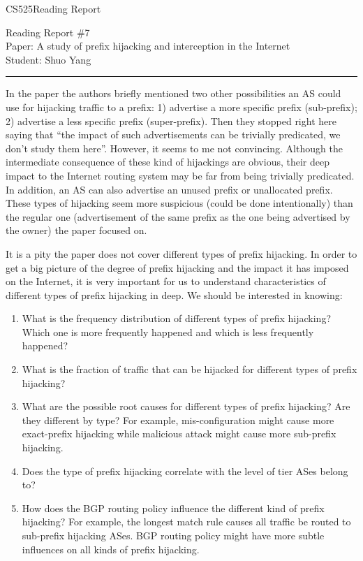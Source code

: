 \documentclass[11pt]{article}
\def\CourseCode{CS525}
\def\ReportNo{7}
\def\Category{Reading Report}
\def\PaperTitle{A study of prefix hijacking and interception in the
  Internet}
\def\Author{Shuo Yang}
\begin{document}
\noindent

\CourseCode \hfill \Category

\begin{center}
Reading Report \#\ReportNo\\
Paper: \PaperTitle\\
Student: \Author\\
\end{center}

\hrule\smallskip
\vspace{1.5em}

In the paper the authors briefly mentioned two other possibilities an
AS could use for hijacking traffic to a prefix: 1) advertise a more
specific prefix (sub-prefix); 2) advertise a less specific
prefix (super-prefix). Then they stopped right here saying that ``the
impact of such advertisements can be trivially predicated, we don't
study them here''. However, it seems to me not convincing. Although
the intermediate consequence of these kind of hijackings are obvious,
their deep impact to the Internet routing system may be far from being
trivially predicated. In addition, an AS can also advertise an unused
prefix or unallocated prefix. These types of hijacking seem more
suspicious (could be done intentionally) than the regular one
(advertisement of the same prefix as the one being advertised by the
owner) the paper focused on.

\vspace{1em}
It is a pity the paper does not cover different types of prefix
hijacking. In order to get a big picture of the degree of prefix
hijacking and the impact it has imposed on the Internet, it is very
important for us to understand characteristics of different types of
prefix hijacking in deep. We should be interested in knowing: 

\begin{enumerate}
\item What is the frequency distribution of different types of prefix
  hijacking? Which one is more frequently happened and which is less
  frequently happened?
\item What is the fraction of traffic that can be hijacked for
  different types of prefix hijacking?
\item What are the possible root causes for different types of prefix
  hijacking? Are they different by type? For example,
  mis-configuration might cause more exact-prefix hijacking while
  malicious attack might cause more sub-prefix hijacking.
\item Does the type of prefix hijacking correlate with the level of
  tier ASes belong to?
\item How does the BGP routing policy influence the different kind of
  prefix hijacking? For example, the longest match rule causes all
  traffic be routed to sub-prefix hijacking ASes. BGP routing policy
  might have more subtle influences on all kinds of prefix hijacking.
\end{enumerate}
\end{document}
